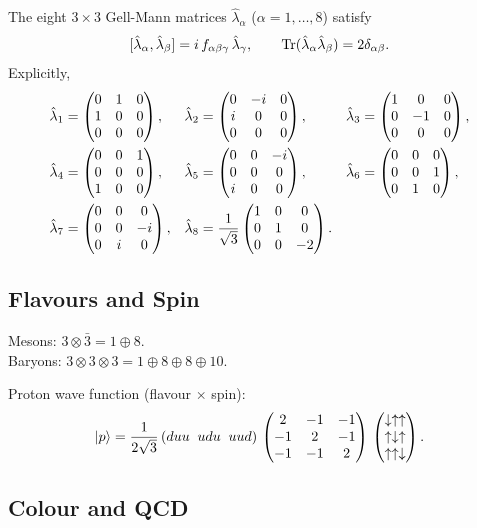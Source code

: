 The eight $3\times 3$ Gell-Mann matrices $\hat{\lambda}_{\alpha}$ ($\alpha=1,\dots,8$) satisfy
\[
[\hat{\lambda}_{\alpha},\hat{\lambda}_{\beta}] = i\,f_{\alpha\beta\gamma}\,\hat{\lambda}_{\gamma},\qquad
\operatorname{Tr}(\hat{\lambda}_{\alpha}\hat{\lambda}_{\beta}) = 2\delta_{\alpha\beta}.
\]
Explicitly,
\begin{align*}
\hat{\lambda}_{1}&=\begin{pmatrix}0&1&0\\1&0&0\\0&0&0\end{pmatrix},&
\hat{\lambda}_{2}&=\begin{pmatrix}0&-i&0\\i&0&0\\0&0&0\end{pmatrix},&
\hat{\lambda}_{3}&=\begin{pmatrix}1&0&0\\0&-1&0\\0&0&0\end{pmatrix},\\
\hat{\lambda}_{4}&=\begin{pmatrix}0&0&1\\0&0&0\\1&0&0\end{pmatrix},&
\hat{\lambda}_{5}&=\begin{pmatrix}0&0&-i\\0&0&0\\i&0&0\end{pmatrix},&
\hat{\lambda}_{6}&=\begin{pmatrix}0&0&0\\0&0&1\\0&1&0\end{pmatrix},\\
\hat{\lambda}_{7}&=\begin{pmatrix}0&0&0\\0&0&-i\\0&i&0\end{pmatrix},&
\hat{\lambda}_{8}&=\frac{1}{\sqrt{3}}\begin{pmatrix}1&0&0\\0&1&0\\0&0&-2\end{pmatrix}.
\end{align*}

\subsection{Flavours and Spin}

Mesons: $3\otimes\bar{3} = 1\oplus 8$.\\
Baryons: $3\otimes 3\otimes 3 = 1\oplus 8\oplus 8\oplus 10$.

Proton wave function (flavour $\times$ spin):
\[
|p\rangle = \frac{1}{2\sqrt{3}}\,
(duu\;\;udu\;\;uud)\,
\begin{pmatrix}2&-1&-1\\-1&2&-1\\-1&-1&2\end{pmatrix}\,
\begin{pmatrix}\downarrow\uparrow\uparrow \\ \uparrow\downarrow\uparrow \\ \uparrow\uparrow\downarrow\end{pmatrix}.
\]

\subsection{Colour and QCD}

